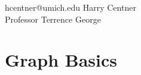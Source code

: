 \documentclass[12pt]{article}
\renewcommand{\maketitle}{%
\begin {flushleft}{\fontsize{25pt}{33pt}\bfseries
\theauthor}}
\begin{document}
\author{Graph Theory Exam Notes}
\date{\today}
\fancyhead{}

\maketitle

\vspace{.7em} %

\large{hcentner@umich.edu \hfill Harry Centner} \\
\hfill Professor Terrence George 


\end{flushleft}

\vspace{-1em}

\section{Graph Basics}
\begin{center} \end{center}
\vspace{-1em}
\end{document}
